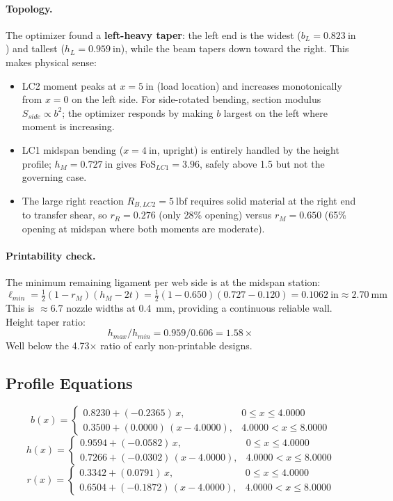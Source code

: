 \documentclass[11pt,letterpaper]{article}
\begin{document}
\paragraph{Topology.}
The optimizer found a \textbf{left-heavy taper}: the left end is the widest
($b_L = 0.823\ \mathrm{in}$) and tallest ($h_L = 0.959\ \mathrm{in}$),
while the beam tapers down toward the right.  This makes physical sense:
\begin{itemize}[noitemsep]
  \item LC2 moment peaks at $x = 5\ \mathrm{in}$ (load location) and
    increases monotonically from $x = 0$ on the left side.  For side-rotated
    bending, section modulus $S_{side} \propto b^2$; the optimizer responds
    by making $b$ largest on the left where moment is increasing.
  \item LC1 midspan bending ($x = 4\ \mathrm{in}$, upright) is entirely
    handled by the height profile; $h_M = 0.727\ \mathrm{in}$ gives
    FoS$_{LC1} = 3.96$, safely above 1.5 but not the governing case.
  \item The large right reaction $R_{B,LC2} = 5\ \mathrm{lbf}$ requires
    solid material at the right end to transfer shear, so $r_R = 0.276$
    (only 28\% opening) versus $r_M = 0.650$ (65\% opening at midspan
    where both moments are moderate).
\end{itemize}

\paragraph{Printability check.}
The minimum remaining ligament per web side is at the midspan station:
\[
  \ell_{min} = \tfrac{1}{2}(1 - r_M)(h_M - 2t)
  = \tfrac{1}{2}(1 - 0.650)(0.727 - 0.120)
  = 0.1062\ \mathrm{in} \approx 2.70\ \mathrm{mm}
\]
This is $\approx 6.7$ nozzle widths at 0.4~mm, providing a continuous
reliable wall.  Height taper ratio:
\[
  h_{max}/h_{min} = 0.959 / 0.606 = 1.58\times
\]
Well below the 4.73$\times$ ratio of early non-printable designs.

\subsection{Profile Equations}

\[
b(x)=\begin{cases}0.8230 + (-0.2365)\,x, & 0 \le x \le 4.0000\\
     0.3500 + (0.0000)\,(x-4.0000), & 4.0000 < x \le 8.0000\end{cases}
\]
\[
h(x)=\begin{cases}0.9594 + (-0.0582)\,x, & 0 \le x \le 4.0000\\
     0.7266 + (-0.0302)\,(x-4.0000), & 4.0000 < x \le 8.0000\end{cases}
\]
\[
r(x)=\begin{cases}0.3342 + (0.0791)\,x, & 0 \le x \le 4.0000\\
     0.6504 + (-0.1872)\,(x-4.0000), & 4.0000 < x \le 8.0000\end{cases}
\]
\end{document}
